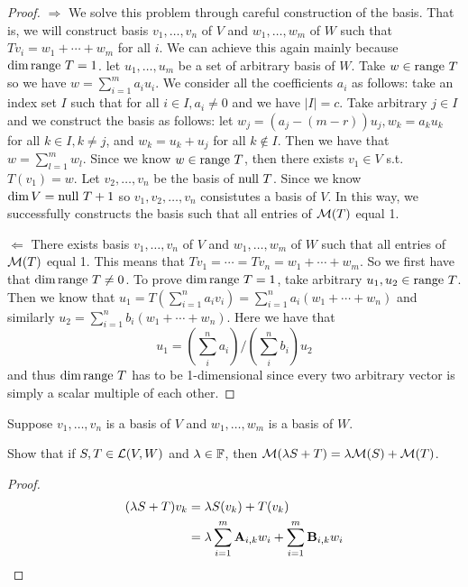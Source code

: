 \documentclass{extarticle}
\begin{document}
\begin{proof}


\(\Rightarrow\) We solve this problem through careful construction of the basis. That is, 
we will construct basis \(v_1, \ldots, v_n\) of \(V\) and \(w_1, \ldots, w_m\) of \(W\)
such that \(T v_i = w_1 + \cdots + w_m\) for all \(i\). We can achieve this again mainly 
because \(\dim \text{range } T  = 1\). let \(u_1, \ldots, u_m\) be a set of arbitrary basis of 
\(W\). Take \(w \in \text{range } T\) so we have \(w = \sum_{i=1}^{m} a_i u_i\). We consider all 
the coefficients \(a_i\) as follows: take an index set \(I\) such that for all \(i \in I, 
a_i \neq 0\) and we have \(|I| = c\). Take arbitrary \(j \in I\) and we construct the 
basis as follows: let \(w_j = (a_j - (m - r))u_j, w_k = a_k u_k \) for all \(k \in I, k \neq j\), 
and \(w_k = u_k + u_j\) for all \(k \notin I\). Then we have that \(w = \sum_{l=1}^{m}w_l\). 
Since we know \(w \in \text{range } T\), then there exists \(v_1 \in V\) s.t. \(T(v_1) = w\). Let 
\(v_2, \ldots, v_n\) be the basis of \(\text{null } T\). Since we know \(\dim V = \text{null } T + 1\) so 
\(v_1, v_2, \ldots, v_n\) consistutes a basis of \(V\). In this way, we successfully constructs
the basis such that all entries of \(\mathcal{M}(T)\) equal 1. 


\(\Leftarrow\) There exists basis \(v_1, \ldots, v_n\) of \(V\) and 
\(w_1, \ldots, w_m\) of \(W\) such that 
all entries of \(\mathcal{M}(T)\) equal 1. This means that \(T v_1 = \cdots = T v_n = w_1 + \cdots + w_m\). 
So we first have that \(\dim \text{range } T \neq 0\). To prove \(\dim \text{range } T = 1\), take arbitrary 
\(u_1, u_2 \in \text{range } T\). Then we know that \(u_1 = T(\sum_{i=1}^{n} a_i v_i) = \sum_{i=1}^{n}a_i (w_1 + \cdots + w_n)\)
and similarly \(u_2 = \sum_{i=1}^{n}b_i (w_1 + \cdots + w_n)\). Here we have that 
\[u_1 =(\sum_i^n a_i) / (\sum_i^n b_i) u_2 \]
and thus \(\dim \text{range } T\) has to be 1-dimensional since every two arbitrary vector is simply a 
scalar multiple of each other. 
\end{proof}

\begin{problem}{3}
    Suppose \(v_1, \ldots, v_n\) is a basis of \(V\) and \(w_1, \ldots, w_m\) is a basis of \(W\). 

    Show that if \(S, T \in \mathcal{L}(V, W)\) and \(\lambda \in \mathbb{F}\), then \(\mathcal{M}(\lambda S +T)
    = \lambda \mathcal{M}(S) + \mathcal{M}(T)\). 
\end{problem}

\begin{proof}
\begin{align*}
    (\lambda S + T) v_k 
    &= \lambda S(v_k) + T(v_k) \\ 
    &= \lambda \sum_{i=1}^{m} \mathbf{A}_{i, k} w_i + \sum_{i=1}^{m} \mathbf{B}_{i, k} w_i 
\end{align*}
\end{proof}
\end{document}
